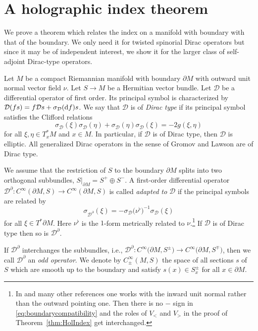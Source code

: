\section{A holographic index theorem}

\label{holographic}

We prove a theorem which relates the index on a manifold with boundary with that of the boundary.
We only need it for twisted spinorial Dirac operators but since it may be of independent interest, we show it for the larger class of self-adjoint Dirac-type operators.

Let $M$ be a compact Riemannian manifold with boundary $\partial M$ with outward unit normal vector field $\nu$.
Let $S \to M$ be a Hermitian vector bundle.
Let $\mathcal{D}$ be a differential operator of first order.
Its principal symbol is characterized by $\mathcal{D}(fs)=f\mathcal{D}s+\sigma_{\mathcal{D}}({\rm d}f)s$.
We say that $\mathcal{D}$ is of \emph{Dirac type} if its principal symbol satisfies the Clifford relations
\[
\sigma_{\mathcal{D}}(\xi)\sigma_{\mathcal{D}}(\eta) + \sigma_{\mathcal{D}}(\eta)\sigma_{\mathcal{D}}(\xi) = -2g(\xi,\eta)
\]
for all $\xi,\eta\in T^*_xM$ and $x\in M$.
In particular, if $\mathcal{D}$ is of Dirac type, then $\mathcal{D}$ is elliptic.
All generalized Dirac operators in the sense of Gromov and Lawson are of Dirac type.

We assume that the restriction of $S$ to the boundary $\partial M$ splits into two orthogonal subbundles, $S|_{\partial M} = S^+\oplus S^-$.
A first-order differential operator $\mathcal{D}^\partial\colon C^\infty(\partial M, S) \to C^\infty(\partial M, S)$ is called \emph{adapted to} $\mathcal{D}$ if the principal symbols are related by
\begin{equation}
\sigma_{\mathcal{D}^\partial}(\xi)=-\sigma_{\mathcal{D}}\big(\nu^\flat\big)^{-1}\sigma_{\mathcal{D}}(\xi)
\label{eq:boundarycompatibility}
\end{equation}
for all $\xi\in T^*\partial M$.
Here $\nu^\flat$ is the $1$-form metrically related to $\nu$.\footnote{In \cite{Baer-Ballmann} and many other references one works with the inward unit normal rather than the outward pointing one. Then there is no $-$ sign in \eqref{eq:boundarycompatibility} and the roles of $V_<$ and $V_>$ in the proof of Theorem~\ref{thm:HolIndex} get interchanged.}
If $\mathcal{D}$ is of Dirac type then so is $\mathcal{D}^\partial$.

If $\mathcal{D}^\partial$ interchanges the subbundles, i.e., $\mathcal{D}^\partial\colon C^\infty\big(\partial M, S^\pm\big) \to C^\infty\big(\partial M, S^\mp\big)$, then we call $\mathcal{D}^\partial$ an \emph{odd operator}.
We denote by $C^\infty_\pm(M,S)$ the space of all sections $s$ of $S$ which are smooth up to the boundary and satisfy $s(x)\in S^\pm_x$ for all $x\in\partial M$.

